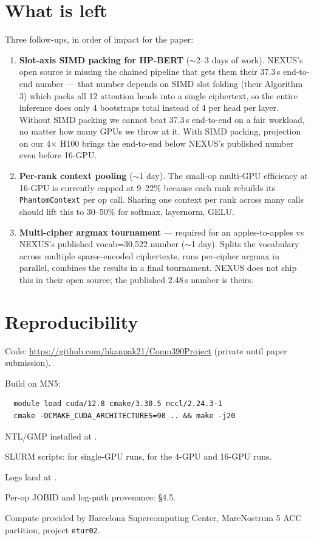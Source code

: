 \documentclass[11pt,a4paper]{article}
\begin{document}
\section*{What is left}

Three follow-ups, in order of impact for the paper:

\begin{enumerate}
\item \textbf{Slot-axis SIMD packing for HP-BERT} ($\sim$2--3 days of work). NEXUS's open source is missing the chained pipeline that gets them their 37.3\,s end-to-end number --- that number depends on SIMD slot folding (their Algorithm 3) which packs all 12 attention heads into a single ciphertext, so the entire inference does only 4 bootstraps total instead of 4 per head per layer. Without SIMD packing we cannot beat 37.3\,s end-to-end on a fair workload, no matter how many GPUs we throw at it. With SIMD packing, projection on our 4$\times$ H100 brings the end-to-end below NEXUS's published number even before 16-GPU.
\item \textbf{Per-rank context pooling} ($\sim$1 day). The small-op multi-GPU efficiency at 16-GPU is currently capped at 9--22\% because each rank rebuilds its \texttt{PhantomContext} per op call. Sharing one context per rank across many calls should lift this to 30--50\% for softmax, layernorm, GELU.
\item \textbf{Multi-cipher argmax tournament} --- required for an apples-to-apples vs NEXUS's published vocab=30{,}522 number ($\sim$1 day). Splits the vocabulary across multiple sparse-encoded ciphertexts, runs per-cipher argmax in parallel, combines the results in a final tournament. NEXUS does not ship this in their open source; the published 2.48\,s number is theirs.
\end{enumerate}

\section*{Reproducibility}

Code: \url{https://github.com/hkanpak21/Comp390Project} (private until paper submission).

Build on MN5:
\begin{verbatim}
  module load cuda/12.8 cmake/3.30.5 nccl/2.24.3-1
  cmake -DCMAKE_CUDA_ARCHITECTURES=90 .. && make -j20
\end{verbatim}
NTL/GMP installed at .

SLURM scripts:  for single-GPU runs,  for the 4-GPU and 16-GPU runs.

Logs land at .

Per-op JOBID and log-path provenance:  \S4.5.

Compute provided by Barcelona Supercomputing Center, MareNostrum 5 ACC partition, project \texttt{etur02}.
\end{document}
